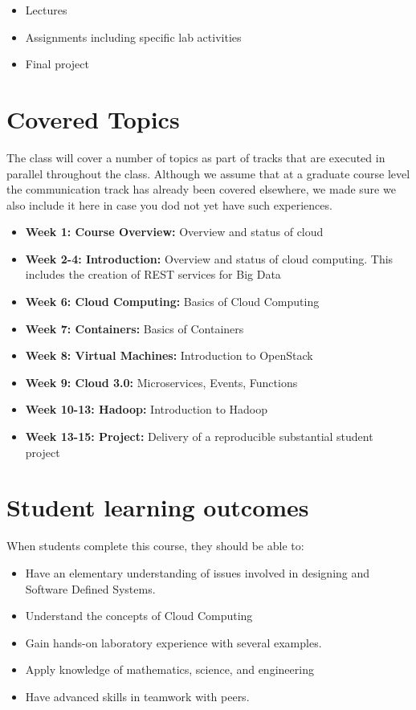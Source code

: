 \begin{itemize}
\item Lectures
\item Assignments including specific lab activities
\item Final project 
\end{itemize}

\section{Covered Topics}

The class will cover a number of topics as part of tracks that are
executed in parallel throughout the class. Although we assume that at
a graduate course level the communication track has already been
covered elsewhere, we made sure we also include it here in case you dod
not yet have such experiences.

\begin{itemize}

\item {\bf Week 1: Course Overview:} Overview and status of cloud
\item {\bf Week 2-4: Introduction:} Overview and status of cloud
  computing. This includes the creation of REST services for Big Data
\item {\bf Week 6: Cloud Computing:} Basics of Cloud Computing 
\item {\bf Week 7: Containers:} Basics of Containers
\item {\bf Week 8: Virtual Machines:} Introduction to OpenStack
\item {\bf Week 9: Cloud 3.0:} Microservices, Events, Functions  
\item {\bf Week 10-13: Hadoop:} Introduction to Hadoop
\item {\bf Week 13-15: Project:} Delivery of a reproducible
  substantial student project
 
\end{itemize}

\section{Student learning outcomes}

When students complete this course, they should be able to:

\begin{itemize}
\item Have an elementary understanding of issues involved in designing
  and Software Defined Systems.
\item Understand the concepts of Cloud Computing
\item Gain hands-on laboratory experience with several examples.
\item Apply knowledge of mathematics, science, and engineering
\item	Have advanced skills in teamwork with peers.
\end{itemize}

